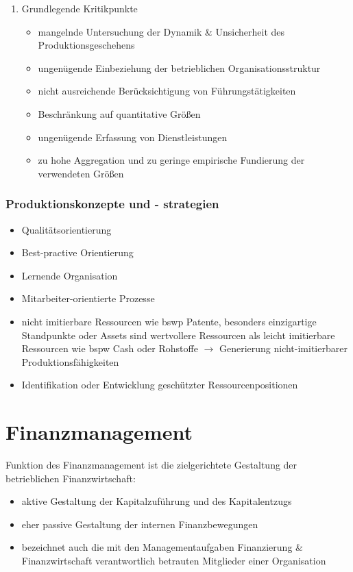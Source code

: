 \documentclass[11pt]{article}
\begin{document}
\begin{enumerate}
\item Grundlegende Kritikpunkte
\label{sec:org3f058a1}
\begin{itemize}
\item mangelnde Untersuchung der Dynamik \& Unsicherheit des Produktionsgeschehens
\item ungenügende Einbeziehung der betrieblichen Organisationsstruktur
\item nicht ausreichende Berücksichtigung von Führungstätigkeiten
\item Beschränkung auf quantitative Größen
\item ungenügende Erfassung von Dienstleistungen
\item zu hohe Aggregation und zu geringe empirische Fundierung der verwendeten Größen
\end{itemize}
\end{enumerate}

\subsubsection{Produktionskonzepte und - strategien}
\label{sec:org5fe2795}
\begin{itemize}
\item Qualitätsorientierung
\item Best-practive Orientierung
\item Lernende Organisation
\item Mitarbeiter-orientierte Prozesse
\item nicht imitierbare Ressourcen wie bswp Patente, besonders einzigartige Standpunkte oder Assets sind wertvollere Ressourcen als leicht imitierbare Ressourcen wie bspw Cash oder Rohstoffe \(\rightarrow\) Generierung nicht-imitierbarer Produktionsfähigkeiten
\item Identifikation oder Entwicklung geschützter Ressourcenpositionen
\end{itemize}
\section{Finanzmanagement}
\label{sec:org44043d1}
Funktion des Finanzmanagement ist die zielgerichtete Gestaltung der betrieblichen Finanzwirtschaft:
\begin{itemize}
\item aktive Gestaltung der Kapitalzuführung und des Kapitalentzugs
\item eher passive Gestaltung der internen Finanzbewegungen
\item bezeichnet auch die mit den Managementaufgaben Finanzierung \& Finanzwirtschaft verantwortlich betrauten Mitglieder einer Organisation
\end{itemize}
\end{document}
